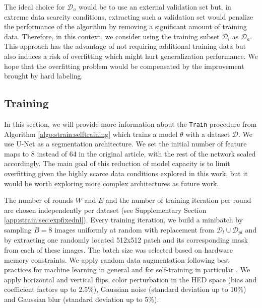 The ideal choice for $\mathcal{D}_{a}$ would be to use an external validation set but, in extreme data scarcity conditions, extracting such a validation set would penalize the performance of the algorithm by removing a significant amount of training data. Therefore, in this context, we consider using the training subset $\mathcal{D}_l$ as $\mathcal{D}_a$.
This approach has the advantage of not requiring additional training data but also induces a risk of overfitting which might hurt generalization performance. We hope that the overfitting problem would be compensated by the improvement brought by hard labeling.

\subsection{Training}
\label{ssec:strain:training_protocol}

In this section, we will provide more information about the \texttt{Train} procedure from Algorithm \ref{algo:strain:selftraining} which trains a model $\theta$ with a dataset $\mathcal{D}$.
We use U-Net \parencite{ronneberger2015unet} as a segmentation architecture. We set the initial number of feature maps to 8 instead of 64 in the original article, with the rest of the network scaled accordingly. The main goal of this reduction of model capacity is to limit overfitting given the highly scarce data conditions explored in this work, but it would be worth exploring more complex architectures as future work.


The number of rounds $W$ and $E$ and the number of training iteration per round are chosen independently per dataset (see Supplementary Section \ref{app:strain:sec:expfixednl}). Every training iteration, we build a minibatch by sampling $B=8$ images uniformly at random with replacement from $\mathcal{D}_l \cup \mathcal{D}_{pl}$ and by extracting one randomly located 512x512 patch and its corresponding mask from each of these images. The batch size was selected based on hardware memory constraints. We apply random data augmentation following best practices for machine learning in general and for self-training in particular \parencite{xie2020self,sohn2020fixmatch}. We apply horizontal and vertical flips, color perturbation in the HED space \parencite{tellez2018whole} (bias and coefficient factors up to 2.5\%), Gaussian noise (standard deviation up to 10\%) and Gaussian blur (standard deviation up to 5\%). 

